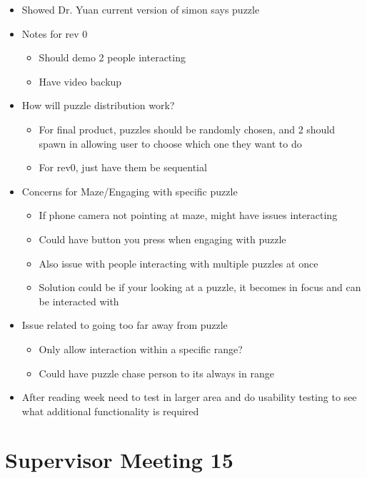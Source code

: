 \documentclass{article}
\begin{document}
\begin{itemize}
    \item Showed Dr. Yuan current version of simon says puzzle
    \item Notes for rev 0
    \begin{itemize}
        \item Should demo 2 people interacting
        \item Have video backup
    \end{itemize}
    \item How will puzzle distribution work?
    \begin{itemize}
        \item For final product, puzzles should be randomly chosen, and 2 should spawn in allowing user to choose which one they want to do
        \item For rev0, just have them be sequential
    \end{itemize}
    \item Concerns for Maze/Engaging with specific puzzle
    \begin{itemize}
        \item If phone camera not pointing at maze, might have issues interacting
        \item Could have button you press when engaging with puzzle
        \item Also issue with people interacting with multiple puzzles at once
        \item Solution could be if your looking at a puzzle, it becomes in focus and can be interacted with
    \end{itemize}
    \item Issue related to going too far away from puzzle
    \begin{itemize}
        \item Only allow interaction within a specific range?
        \item Could have puzzle chase person to its always in range
    \end{itemize}
    \item After reading week need to test in larger area and do usability testing to see what additional functionality is required
    
\end{itemize}

\pagebreak

\section*{Supervisor Meeting 15}
\end{document}
